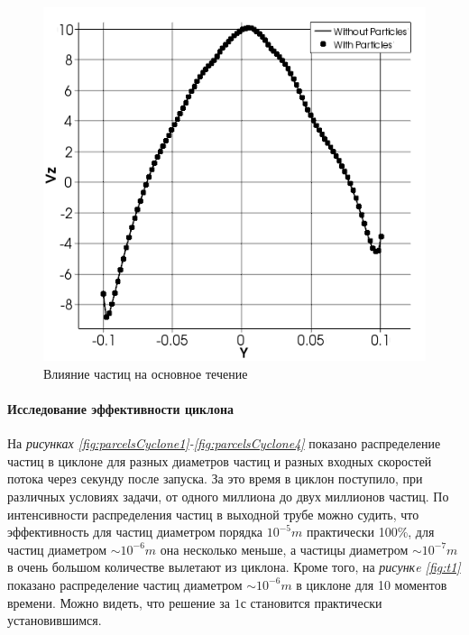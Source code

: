 \begin{figure}[h]
	\centering
	\vspace{-3em}
	\includegraphics[scale=0.4]{parcelsInteraction}
	\caption{Влияние частиц на основное течение}
	\label{fig:parcelsInteraction}
\end{figure}
\vspace{-2em}
\paragraph{Исследование эффективности циклона\\}

На \textit{рисунках \ref{fig:parcelsCyclone1}-\ref{fig:parcelsCyclone4}} показано распределение частиц в циклоне для разных диаметров частиц и разных входных скоростей потока через секунду после запуска. За это время в циклон поступило, при различных условиях задачи, от одного миллиона до двух миллионов частиц. По интенсивности распределения частиц в выходной трубе можно судить, что эффективность для частиц диаметром порядка $10^{-5}m$ практически 100\%, для частиц диаметром $\sim 10^{-6}m$ она несколько меньше, а частицы диаметром $\sim 10^{-7}m$ в очень большом количестве вылетают из циклона. Кроме того, на \textit{рисункe \ref{fig:t1}} показано распределение частиц диаметром $\sim 10^{-6}m$ в циклоне для 10 моментов времени. Можно видеть, что решение за $1$с становится практически установившимся.

